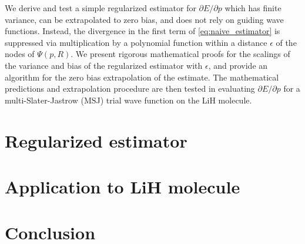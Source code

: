 \documentclass{article}
\begin{document}
We derive and test a simple regularized estimator for $\partial E/\partial p$ which has finite variance, can be extrapolated to zero bias, and does not rely on guiding wave functions.
Instead, the divergence in the first term of \eqref{eq:naive_estimator} is suppressed via multiplication by a polynomial function within a distance $\epsilon$ of the nodes of $\Psi(p, R)$. 
We present rigorous mathematical proofs for the scalings of the variance and bias of the regularized estimator with $\epsilon$, and provide an algorithm for the zero bias extrapolation of the estimate.
The mathematical predictions and extrapolation procedure are then tested in evaluating $\partial E/\partial p$ for a multi-Slater-Jastrow (MSJ) trial wave function on the LiH molecule.

\section{Regularized estimator}
\section{Application to LiH molecule}
\section{Conclusion}


\end{document}
